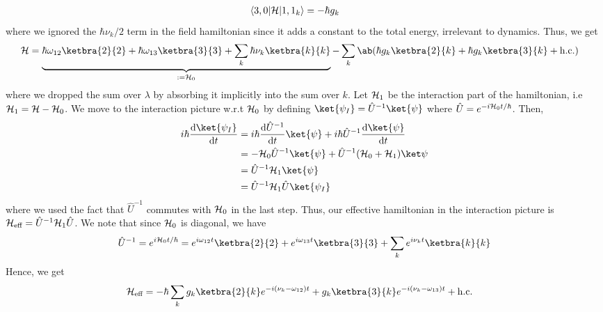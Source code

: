 \documentclass[12pt]{article}
\begin{document}
\begin{ans}
\begin{align*}
        \langle 3, 0 \vert \mathcal{H} \vert 1, 1_k \rangle &= -\hbar g_k &&
    \end{align*}
    where we ignored the $\hbar\nu_k/2$ term in the field hamiltonian since it adds a constant to the total energy, irrelevant to dynamics. Thus, we get 
    \begin{align*}
        \HH &= \underbrace{\hbar\omega_{12}\ketbra{2}{2} + \hbar\omega_{13}\ketbra{3}{3} + \sum_{k}\hbar \nu_k\ketbra{k}{k}}_{:= \HH_0}  - \sum_{k} \ab(\hbar g_k\ketbra{2}{k} + \hbar g_k\ketbra{3}{k} + \text{h.c.})
    \end{align*}
    where we dropped the sum over $\lambda$ by absorbing it implicitly into the sum over $k$.  Let $\mathcal{H}_1$ be the interaction part of the hamiltonian, i.e $\mathcal{H}_1 = \mathcal{H} - \mathcal{H}_0$. We move to the interaction picture w.r.t $\mathcal{H}_0$ by defining $\ket{\psi_I} = \hat U^{-1}\ket{\psi}$ where $\hat U = e^{-i\mathcal{H}_0 t/\hbar}$. Then, 
    \begin{align*}
        i\hbar\odv{\ket{\psi_I}}{t} &= i\hbar \odv{\hat U^{-1}}{t} \ket{\psi} + i\hbar \hat{U}^{-1}\odv{\ket{\psi}}{t} \\
        &= - \HH_0 \hat U^{-1} \ket{\psi} + \hat U^{-1}(\HH_0 + \HH_1) \ket\psi \\
        &= \hat U^{-1} \HH_1 \ket{\psi}\\
        &= \hat U^{-1} \HH_1 \hat U \ket{\psi_I}
    \end{align*}
    where we used the fact that $\hat U^{-1}$ commutes with $\mathcal{H}_0$ in the last step. Thus, our effective hamiltonian in the interaction picture is $\mathcal{H}_{\text{eff}} = \hat U^{-1} \mathcal{H}_1 \hat U$. We note that since $\mathcal{H}_0$ is diagonal, we have 
    \begin{align*}
        \hat U^{-1}= e^{i\HH_0 t/\hbar} = e^{i\omega_{12}t}\ketbra{2}{2} + e^{i\omega_{13}t}\ketbra{3}{3} + \sum_k e^{i\nu_k t}\ketbra{k}{k}
    \end{align*}
    Hence, we get
    \begin{align*}
        \HH_{\text{eff}} &= -\hbar \sum_k g_k \ketbra{2}{k} e^{-i(\nu_k - \omega_{12})t} + g_k \ketbra{3}{k} e^{-i(\nu_k - \omega_{13})t}+ \text{h.c.}
    \end{align*}
\end{ans}
\end{document}
